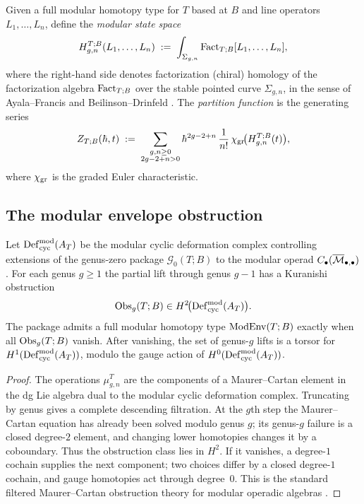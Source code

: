 \begin{definition}
\label{def:modular-state-spaces-partition-function}
Given a full modular homotopy type for $T$ based at $B$ and line operators
$L_1,\dots,L_n$, define the \emph{modular state space}
\begin{equation}
\label{eq:modular-state-space}
H_{g,n}^{T;B}(L_1,\dots,L_n)
\;:=\;
\int_{\Sigma_{g,n}}\operatorname{Fact}_{T;B}[L_1,\dots,L_n],
\end{equation}
where the right-hand side denotes factorization (chiral) homology of the factorization algebra
$\operatorname{Fact}_{T;B}$ over the stable pointed curve $\Sigma_{g,n}$, in the sense of Ayala--Francis
\cite{AF15} and Beilinson--Drinfeld \cite{BD04}. The \emph{partition function} is the
generating series
\begin{equation}
\label{eq:partition-function}
Z_{T;B}(\hbar,t)
\;:=\;
\sum_{\substack{g,n\ge 0\\2g-2+n>0}}
\hbar^{2g-2+n}\,\frac{1}{n!}\,\chi_{\operatorname{gr}}\!\bigl(H_{g,n}^{T;B}(t)\bigr),
\end{equation}
where $\chi_{\operatorname{gr}}$ is the graded Euler characteristic.
\end{definition}

\subsection{The modular envelope obstruction}
\label{subsec:modular-envelope-obstruction}

\begin{proposition}
\label{prop:modular-envelope-obstruction-criterion}
Let $\operatorname{Def}_{\mathrm{cyc}}^{\mathrm{mod}}(A_T)$ be the modular cyclic deformation complex controlling
extensions of the genus-zero package $\mathcal G_0(T;B)$ to the modular operad
$C_\bullet(\overline{\mathcal M}_{\bullet,\bullet})$. For each genus $g\geq 1$ the partial lift through
genus $g-1$ has a Kuranishi obstruction
\[
\operatorname{Obs}_g(T;B)\in H^2\!\bigl(\operatorname{Def}_{\mathrm{cyc}}^{\mathrm{mod}}(A_T)\bigr).
\]
The package admits a full modular homotopy type $\operatorname{ModEnv}(T;B)$ exactly when all
$\operatorname{Obs}_g(T;B)$ vanish. After vanishing, the set of genus-$g$ lifts is a torsor for
$H^1(\operatorname{Def}_{\mathrm{cyc}}^{\mathrm{mod}}(A_T))$, modulo the gauge action of
$H^0(\operatorname{Def}_{\mathrm{cyc}}^{\mathrm{mod}}(A_T))$.
\end{proposition}

\begin{proof}
The operations $\mu_{g,n}^T$ are the components of a Maurer--Cartan element in the dg Lie
algebra dual to the modular cyclic deformation complex. Truncating by genus gives a
complete descending filtration. At the $g$th step the Maurer--Cartan equation has already
been solved modulo genus $g$; its genus-$g$ failure is a closed degree-$2$ element, and
changing lower homotopies changes it by a coboundary. Thus the obstruction class lies in
$H^2$. If it vanishes, a degree-$1$ cochain supplies the next component; two choices differ
by a closed degree-$1$ cochain, and gauge homotopies act through degree~$0$. This is the
standard filtered Maurer--Cartan obstruction theory for modular operadic algebras
\cite{GeK98}.
\end{proof}

